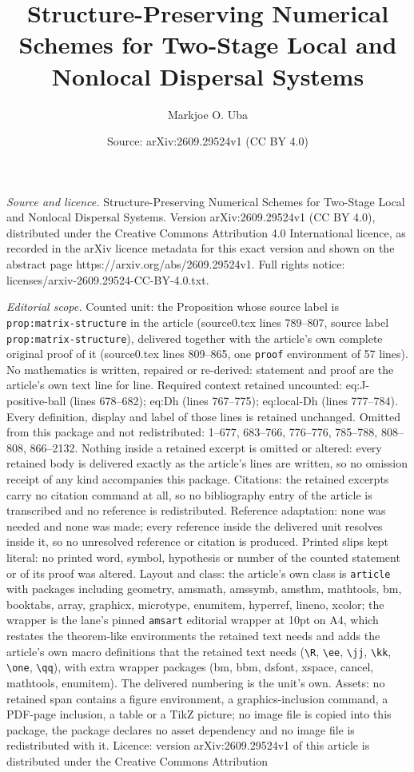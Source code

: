 \documentclass[10pt,a4paper]{amsart}
\title[Structure-Preserving Numerical Schemes for Two-Stage Local a]{Structure-Preserving Numerical Schemes for Two-Stage Local and Nonlocal Dispersal Systems}
\author{Markjoe O. Uba}
\date{Source: arXiv:2609.29524v1 (CC BY 4.0)}
\begin{document}
\maketitle

\noindent\emph{Source and licence.} Structure-Preserving Numerical Schemes for Two-Stage Local and Nonlocal Dispersal Systems. Version arXiv:2609.29524v1 (CC BY 4.0), distributed under the Creative Commons Attribution 4.0 International licence, as recorded in the arXiv licence metadata for this exact version and shown on the abstract page https://arxiv.org/abs/2609.29524v1. Full rights notice: licenses/arxiv-2609.29524-CC-BY-4.0.txt.\par\smallskip

\noindent\textit{Editorial scope.} Counted unit: the Proposition whose source label is \texttt{prop:matrix-structure} in the article (source0.tex lines 789--807, source label \texttt{prop:matrix-structure}), delivered together with the article's own complete original proof of it (source0.tex lines 809--865, one \texttt{proof} environment of 57 lines). No mathematics is written, repaired or re-derived: statement and proof are the article's own text line for line. Required context retained uncounted: eq:J-positive-ball (lines 678--682); eq:Dh (lines 767--775); eq:local-Dh (lines 777--784). Every definition, display and label of those lines is retained unchanged. Omitted from this package and not redistributed: 1--677, 683--766, 776--776, 785--788, 808--808, 866--2132. Nothing inside a retained excerpt is omitted or altered: every retained body is delivered exactly as the article's lines are written, so no omission receipt of any kind accompanies this package. Citations: the retained excerpts carry no citation command at all, so no bibliography entry of the article is transcribed and no reference is redistributed. Reference adaptation: none was needed and none was made; every reference inside the delivered unit resolves inside it, so no unresolved reference or citation is produced. Printed slips kept literal: no printed word, symbol, hypothesis or number of the counted statement or of its proof was altered. Layout and class: the article's own class is \texttt{article} with packages including geometry, amsmath, amssymb, amsthm, mathtools, bm, booktabs, array, graphicx, microtype, enumitem, hyperref, lineno, xcolor; the wrapper is the lane's pinned \texttt{amsart} editorial wrapper at 10pt on A4, which restates the theorem-like environments the retained text needs and adds the article's own macro definitions that the retained text needs (\texttt{\textbackslash R}, \texttt{\textbackslash ee}, \texttt{\textbackslash jj}, \texttt{\textbackslash kk}, \texttt{\textbackslash one}, \texttt{\textbackslash qq}), with extra wrapper packages (bm, bbm, dsfont, xspace, cancel, mathtools, enumitem). The delivered numbering is the unit's own. Assets: no retained span contains a figure environment, a graphics-inclusion command, a PDF-page inclusion, a table or a TikZ picture; no image file is copied into this package, the package declares no asset dependency and no image file is redistributed with it. Licence: version arXiv:2609.29524v1 of this article is distributed under the Creative Commons Attribution 
\end{document}

